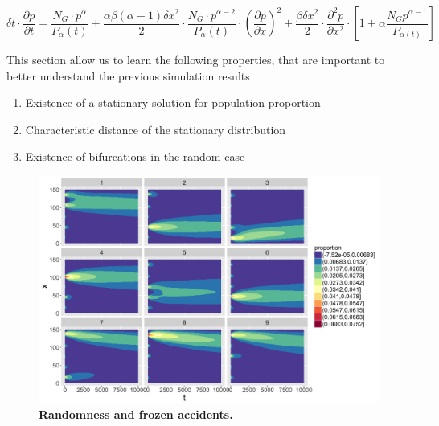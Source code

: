 \documentclass[10pt,letterpaper,draft]{article}
\begin{document}
\begin{equation}\label{eq:pde}
\delta t \cdot \frac{\partial p}{\partial t} = \frac{N_G \cdot p^{\alpha}}{P_{\alpha}(t)} + \frac{\alpha \beta (\alpha - 1) \delta x^2}{2}\cdot \frac{N_G \cdot p^{\alpha-2}}{P_{\alpha}(t)} \cdot \left(\frac{\partial p}{\partial x}\right)^2 + \frac{\beta \delta x^2}{2} \cdot \frac{\partial^2 p}{\partial x^2} \cdot\left[ 1 + \alpha \frac{N_G p^{\alpha - 1}}{P_{\alpha(t)}} \right]
\end{equation}


\cite{tadmor2012review}

This section allow us to learn the following properties, that are important to better understand the previous simulation results
\begin{enumerate}
\item Existence of a stationary solution for population proportion
\item Characteristic distance of the stationary distribution
\item Existence of bifurcations in the random case
\end{enumerate}





\begin{figure}
\includegraphics[width=\textwidth]{figures/Fig4.png}
\caption{\textbf{Randomness and frozen accidents.}}
\label{fig:fig4}
\end{figure}
\end{document}
